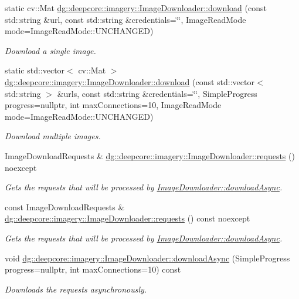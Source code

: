 \begin{DoxyCompactItemize}
static cv\+::\+Mat \hyperlink{group___imagery_module_ga82fca828a982b5f7cb7c15669c5b23df}{dg\+::deepcore\+::imagery\+::\+Image\+Downloader\+::download} (const std\+::string \&url, const std\+::string \&credentials=\char`\"{}\char`\"{}, Image\+Read\+Mode mode=Image\+Read\+Mode\+::\+U\+N\+C\+H\+A\+N\+G\+ED)
\begin{DoxyCompactList}\small\item\em Download a single image. \end{DoxyCompactList}\item 
static std\+::vector$<$ cv\+::\+Mat $>$ \hyperlink{group___imagery_module_gaacc87d30277f2e58dd3cc5a52c8d4a5a}{dg\+::deepcore\+::imagery\+::\+Image\+Downloader\+::download} (const std\+::vector$<$ std\+::string $>$ \&urls, const std\+::string \&credentials=\char`\"{}\char`\"{}, Simple\+Progress progress=nullptr, int max\+Connections=10, Image\+Read\+Mode mode=Image\+Read\+Mode\+::\+U\+N\+C\+H\+A\+N\+G\+ED)
\begin{DoxyCompactList}\small\item\em Download multiple images. \end{DoxyCompactList}\item 
Image\+Download\+Requests \& \hyperlink{group___imagery_module_ga7c66e615a56d4f8e747cb3f0af302ca8}{dg\+::deepcore\+::imagery\+::\+Image\+Downloader\+::requests} () noexcept
\begin{DoxyCompactList}\small\item\em Gets the requests that will be processed by \hyperlink{group___imagery_module_ga64b386de28c7445ef9e1b679d31147c7}{Image\+Downloader\+::download\+Async}. \end{DoxyCompactList}\item 
const Image\+Download\+Requests \& \hyperlink{group___imagery_module_gafaeeb86aeb496d8e57515f17c098dc76}{dg\+::deepcore\+::imagery\+::\+Image\+Downloader\+::requests} () const noexcept
\begin{DoxyCompactList}\small\item\em Gets the requests that will be processed by \hyperlink{group___imagery_module_ga64b386de28c7445ef9e1b679d31147c7}{Image\+Downloader\+::download\+Async}. \end{DoxyCompactList}\item 
void \hyperlink{group___imagery_module_ga64b386de28c7445ef9e1b679d31147c7}{dg\+::deepcore\+::imagery\+::\+Image\+Downloader\+::download\+Async} (Simple\+Progress progress=nullptr, int max\+Connections=10) const 
\begin{DoxyCompactList}\small\item\em Downloads the requests asynchronously. \end{DoxyCompactList}\item 

\end{DoxyCompactItemize}
